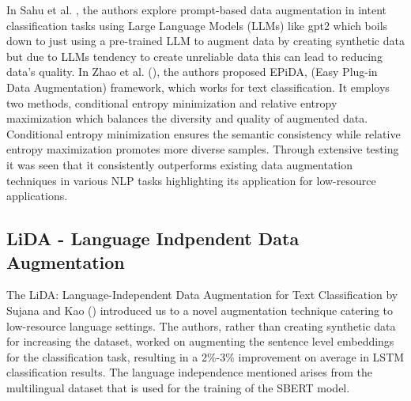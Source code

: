  In Sahu et al. \citeyear{sahu-etal-2022-data}, the authors explore prompt-based data augmentation in intent classification tasks using Large Language Models (LLMs) like gpt2 \citep{radford2019language} which boils down to just using a pre-trained LLM to augment data by creating synthetic data but due to LLMs tendency to create unreliable data this can lead to reducing data's quality. In Zhao et al. (\citeyear{zhao-etal-2022-epida}), the authors proposed EPiDA, (Easy Plug-in Data Augmentation) framework, which works for text classification. It employs two methods, conditional entropy minimization and relative entropy maximization which balances the diversity and quality of augmented data. Conditional entropy minimization ensures the semantic consistency while relative entropy maximization promotes more diverse samples. Through extensive testing it was seen that it consistently outperforms existing data augmentation techniques in various NLP tasks highlighting its application for low-resource applications. 
\\
\subsection{LiDA - Language Indpendent Data Augmentation}

The LiDA: Language-Independent Data Augmentation for Text Classification by
 Sujana and Kao (\citeyear{LiDA}) introduced us to a novel augmentation technique catering to low-resource language settings. The authors, rather than creating synthetic data for increasing the dataset, worked on augmenting the sentence level embeddings for the classification task, resulting in a 2\%-3\% improvement on average in LSTM classification results. The language independence mentioned arises from the multilingual dataset that is used for the training of the SBERT model.